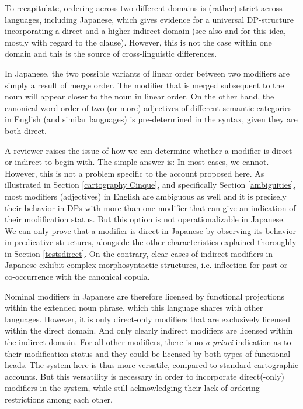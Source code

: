 To recapitulate, ordering across two different domains is (rather) strict across languages, including Japanese, which gives evidence for a universal DP-structure incorporating a direct and a higher indirect domain (see also \citealt{ramchand:2014:deriving} and \citealt{wurmbrand:2023:ich} for this idea, mostly with regard to the clause). However, this is not the case within one domain and this is the source of cross-linguistic differences.

In Japanese, the two possible variants of linear order between two modifiers are simply a result of merge order. The modifier that is merged subsequent to the noun will appear closer to the noun in linear order. On the other hand, the canonical word order of two (or more) adjectives of different semantic categories in English (and similar languages) is pre-determined in the syntax, given they are both direct.

A reviewer raises the issue of how we can determine whether a modifier is direct or indirect to begin with. The simple answer is: In most cases, we cannot. However, this is not a problem specific to the account proposed here. As illustrated in Section \ref{cartography Cinque}, and specifically Section \ref{ambiguities}, most modifiers (adjectives) in  English are ambiguous as well and it is precisely their behavior in DPs with more than one modifier that can give an indication of their modification status. But this option is not operationalizable in Japanese. We can only prove that a modifier is direct in Japanese by observing its behavior in predicative structures, alongside the other characteristics explained thoroughly in Section \ref{testsdirect}. On the contrary, clear cases of indirect modifiers in Japanese exhibit complex morphosyntactic structures, i.e. inflection for past or co-occurrence with the canonical copula.

Nominal modifiers in Japanese are therefore licensed by functional projections within the extended noun phrase, which this language shares with other languages. However, it is only direct-only modifiers that are exclusively licensed within the direct domain. And only clearly indirect modifiers are licensed within the indirect domain. For all other modifiers, there is no \textit{a priori} indication as to their modification status and they could be licensed by both types of functional heads. The system here is thus more versatile, compared to standard cartographic accounts. But this versatility is necessary in order to incorporate direct(-only) modifiers in the system, while still acknowledging their lack of ordering restrictions among each other.

